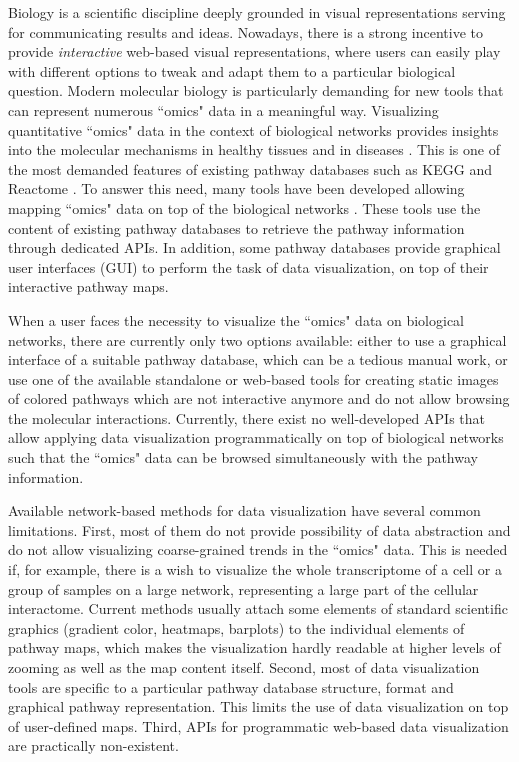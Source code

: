 \documentclass[a4,center,fleqn]{NAR}
\begin{document}
Biology is a scientific discipline deeply grounded in visual representations
serving for communicating results and ideas. Nowadays, there is a strong
incentive to provide \emph{interactive} web-based visual representations, where
users can easily play with different options to tweak and adapt them to a
particular biological question. Modern molecular biology is particularly
demanding for new tools that can represent numerous ``omics" data in a
meaningful way.  Visualizing quantitative ``omics" data in the context of
biological networks provides insights into the molecular mechanisms in healthy
tissues and in diseases \cite{Gehlenborg2010,Barillot2012}. This is one of the
most demanded features of existing pathway databases such as KEGG and Reactome
\cite{Kanehisa2012, Croft2014}. To answer this need, many tools have been
developed allowing mapping ``omics" data on top of the biological networks
\cite{Arakawa2005,vanIersel2008,Luo2013, Nishida2014}. These tools use the
content of existing pathway databases to retrieve the pathway information
through dedicated APIs. In addition, some pathway databases provide graphical
user interfaces (GUI) to perform the task of data visualization, on top of
their interactive pathway maps.

When a user faces the necessity to visualize the ``omics" data on
biological networks, there are currently only two options available: either to use
a graphical interface of a suitable pathway database, which can be a tedious manual work, or use
one of the available standalone or web-based tools for creating static images
of colored pathways which are not interactive anymore and do not allow browsing
the molecular interactions. Currently, there exist no well-developed APIs
that allow applying data visualization programmatically on top of biological
networks such that the ``omics" data can be browsed simultaneously with the
pathway information.

Available network-based methods for data visualization have several common
limitations. First, most of them do not provide possibility of data
abstraction and do not allow visualizing coarse-grained trends in the ``omics" data.
This is needed if, for example, there is a wish to visualize the whole
transcriptome of a cell or a group of samples on a large network,
representing a large part of the cellular interactome. Current methods usually attach
some elements of standard scientific graphics (gradient color, heatmaps,
barplots) to the individual elements of pathway maps, which makes the
visualization hardly readable at higher levels of zooming as well as the map
content itself. Second, most of data visualization tools are specific to a
particular pathway database structure, format and graphical pathway
representation. This limits the use of data visualization on top of
user-defined maps. Third, APIs for programmatic web-based data
visualization are practically non-existent.
\end{document}
